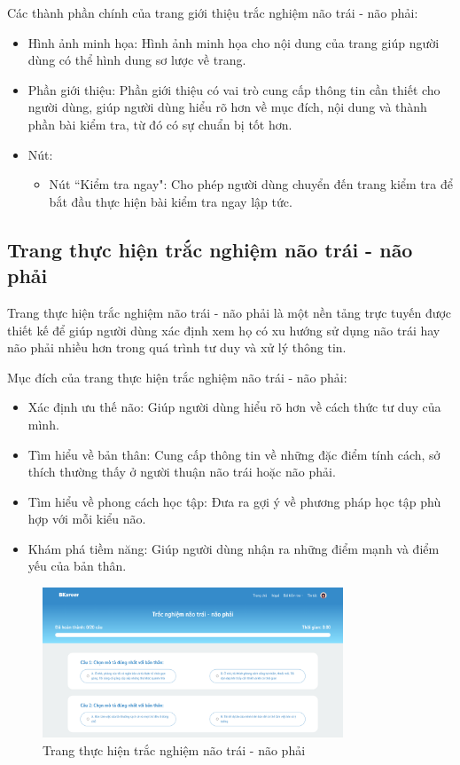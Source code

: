 Các thành phần chính của trang giới thiệu trắc nghiệm não trái - não phải:
\begin{itemize}
    \item Hình ảnh minh họa: Hình ảnh minh họa cho nội dung của trang giúp người dùng có thể hình dung sơ lược về trang.
    \item Phần giới thiệu: Phần giới thiệu có vai trò cung cấp thông tin cần thiết cho người dùng, giúp người dùng hiểu rõ hơn về mục đích, nội dung và thành phần bài kiểm tra, từ đó có sự chuẩn bị tốt hơn.
    \item Nút:
        \begin{itemize}
            \item Nút ``Kiểm tra ngay": Cho phép người dùng chuyển đến trang kiểm tra để bắt đầu thực hiện bài kiểm tra ngay lập tức.
        \end{itemize}
\end{itemize}


\subsection{Trang thực hiện trắc nghiệm não trái - não phải}
Trang thực hiện trắc nghiệm não trái - não phải là một nền tảng trực tuyến được thiết kế để giúp người dùng xác định xem họ có xu hướng sử dụng não trái hay não phải nhiều hơn trong quá trình tư duy và xử lý thông tin.

Mục đích của trang thực hiện trắc nghiệm não trái - não phải:
\begin{itemize}
    \item Xác định ưu thế não: Giúp người dùng hiểu rõ hơn về cách thức tư duy của mình.
    \item Tìm hiểu về bản thân: Cung cấp thông tin về những đặc điểm tính cách, sở thích thường thấy ở người thuận não trái hoặc não phải.
    \item Tìm hiểu về phong cách học tập: Đưa ra gợi ý về phương pháp học tập phù hợp với mỗi kiểu não.
    \item Khám phá tiềm năng: Giúp người dùng nhận ra những điểm mạnh và điểm yếu của bản thân.
\end{itemize}

\begin{figure}[H]
    \centering
    \includegraphics[width=0.8\textwidth]
    {images/chap5/lrBrain.png}
    \vspace{0.5cm}
    \caption{Trang thực hiện trắc nghiệm não trái - não phải}
\end{figure}

